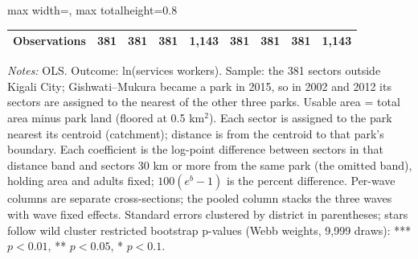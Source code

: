 \documentclass[11pt]{article}
\begin{document}
\begin{table}[H]
\begin{adjustbox}{max width=\textwidth, max totalheight=0.8\textheight}
\begin{tabular}{lcccccccc}
Observations & 381 & 381 & 381 & 1,143 & 381 & 381 & 381 & 1,143 \\
\bottomrule
\end{tabular}
\end{adjustbox}
\begin{minipage}{0.97\textwidth}\scriptsize
\textit{Notes:} OLS. Outcome: ln(services workers). Sample: the 381 sectors outside Kigali City; Gishwati--Mukura became a park in 2015, so in 2002 and 2012 its sectors are assigned to the nearest of the other three parks. Usable area = total area minus park land (floored at 0.5 km$^2$). Each sector is assigned to the park nearest its centroid (catchment); distance is from the centroid to that park's boundary. Each coefficient is the log-point difference between sectors in that distance band and sectors 30 km or more from the same park (the omitted band), holding area and adults fixed; $100(e^{b}-1)$ is the percent difference. Per-wave columns are separate cross-sections; the pooled column stacks the three waves with wave fixed effects. Standard errors clustered by district in parentheses; stars follow wild cluster restricted bootstrap p-values (Webb weights, 9,999 draws): *** $p<0.01$, ** $p<0.05$, * $p<0.1$.
\end{minipage}
\end{table}
\clearpage
\end{document}
